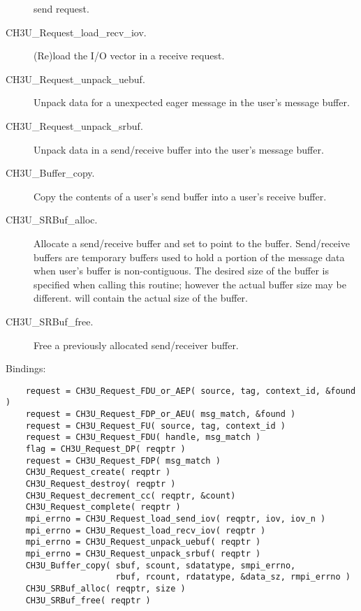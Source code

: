 \documentclass{article}
\begin{document}
\begin{description}
send request.
\item[CH3U\_Request\_load\_recv\_iov.](Re)load the I/O vector in a
receive request.
\item[CH3U\_Request\_unpack\_uebuf.]Unpack data for a unexpected eager
message in the user's message buffer.
\item[CH3U\_Request\_unpack\_srbuf.]Unpack data in a send/receive
buffer into the user's message buffer.
\item[CH3U\_Buffer\_copy.]Copy the contents of a user's send buffer
into a user's receive buffer.
\item[CH3U\_SRBuf\_alloc.]Allocate a send/receive buffer and set
 to point to the buffer.  Send/receive buffers are
temporary buffers used to hold a portion of the message data when
user's buffer is non-contiguous.  The desired size of the buffer is
specified when calling this routine; however the actual buffer size
may be different.   will contain the actual size
of the buffer.
\item[CH3U\_SRBuf\_free.]Free a previously allocated send/receiver buffer.
\end{description}

Bindings:
\begin{verbatim}
    request = CH3U_Request_FDU_or_AEP( source, tag, context_id, &found )
    request = CH3U_Request_FDP_or_AEU( msg_match, &found )
    request = CH3U_Request_FU( source, tag, context_id )
    request = CH3U_Request_FDU( handle, msg_match )
    flag = CH3U_Request_DP( reqptr )
    request = CH3U_Request_FDP( msg_match )
    CH3U_Request_create( reqptr )
    CH3U_Request_destroy( reqptr )
    CH3U_Request_decrement_cc( reqptr, &count)
    CH3U_Request_complete( reqptr )
    mpi_errno = CH3U_Request_load_send_iov( reqptr, iov, iov_n )
    mpi_errno = CH3U_Request_load_recv_iov( reqptr )
    mpi_errno = CH3U_Request_unpack_uebuf( reqptr )
    mpi_errno = CH3U_Request_unpack_srbuf( reqptr )
    CH3U_Buffer_copy( sbuf, scount, sdatatype, smpi_errno,
                      rbuf, rcount, rdatatype, &data_sz, rmpi_errno )
    CH3U_SRBuf_alloc( reqptr, size )
    CH3U_SRBuf_free( reqptr )
\end{verbatim}
\end{document}
